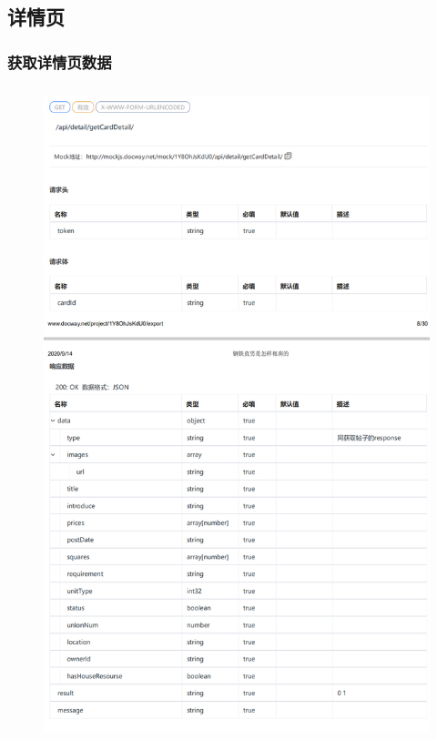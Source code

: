     \subsection{详情页}
    \subsubsection{获取详情页数据}
    \begin{figure}[h]
        \centering
        \includegraphics[height=19.0cm,width=14.0cm]{design/image/api8.png} 
        \end{figure}
        \newpage   
